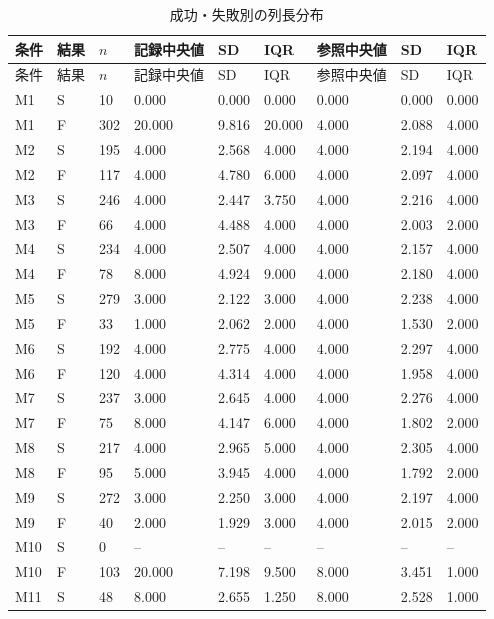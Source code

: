 {\scriptsize\setlength{\tabcolsep}{3pt}
\begin{longtable}{lllllllll}
\caption{成功・失敗別の列長分布}\label{tab:length_distribution}\\
\hline
条件 & 結果 & $n$ & 記録中央値 & SD & IQR & 参照中央値 & SD & IQR\\\hline\endfirsthead
条件 & 結果 & $n$ & 記録中央値 & SD & IQR & 参照中央値 & SD & IQR\\\hline\endhead
\hline\endfoot
M1 & S & 10 & 0.000 & 0.000 & 0.000 & 0.000 & 0.000 & 0.000 \\
M1 & F & 302 & 20.000 & 9.816 & 20.000 & 4.000 & 2.088 & 4.000 \\
M2 & S & 195 & 4.000 & 2.568 & 4.000 & 4.000 & 2.194 & 4.000 \\
M2 & F & 117 & 4.000 & 4.780 & 6.000 & 4.000 & 2.097 & 4.000 \\
M3 & S & 246 & 4.000 & 2.447 & 3.750 & 4.000 & 2.216 & 4.000 \\
M3 & F & 66 & 4.000 & 4.488 & 4.000 & 4.000 & 2.003 & 2.000 \\
M4 & S & 234 & 4.000 & 2.507 & 4.000 & 4.000 & 2.157 & 4.000 \\
M4 & F & 78 & 8.000 & 4.924 & 9.000 & 4.000 & 2.180 & 4.000 \\
M5 & S & 279 & 3.000 & 2.122 & 3.000 & 4.000 & 2.238 & 4.000 \\
M5 & F & 33 & 1.000 & 2.062 & 2.000 & 4.000 & 1.530 & 2.000 \\
M6 & S & 192 & 4.000 & 2.775 & 4.000 & 4.000 & 2.297 & 4.000 \\
M6 & F & 120 & 4.000 & 4.314 & 4.000 & 4.000 & 1.958 & 4.000 \\
M7 & S & 237 & 3.000 & 2.645 & 4.000 & 4.000 & 2.276 & 4.000 \\
M7 & F & 75 & 8.000 & 4.147 & 6.000 & 4.000 & 1.802 & 2.000 \\
M8 & S & 217 & 4.000 & 2.965 & 5.000 & 4.000 & 2.305 & 4.000 \\
M8 & F & 95 & 5.000 & 3.945 & 4.000 & 4.000 & 1.792 & 2.000 \\
M9 & S & 272 & 3.000 & 2.250 & 3.000 & 4.000 & 2.197 & 4.000 \\
M9 & F & 40 & 2.000 & 1.929 & 3.000 & 4.000 & 2.015 & 2.000 \\
M10 & S & 0 & -- & -- & -- & -- & -- & -- \\
M10 & F & 103 & 20.000 & 7.198 & 9.500 & 8.000 & 3.451 & 1.000 \\
M11 & S & 48 & 8.000 & 2.655 & 1.250 & 8.000 & 2.528 & 1.000 \\

\end{longtable}}
